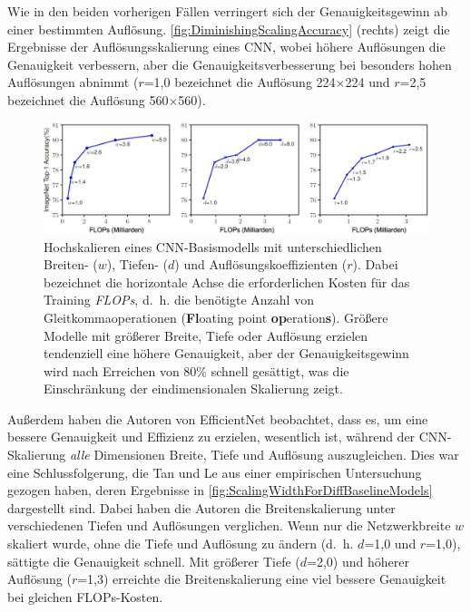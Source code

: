 \begin{description}
	Wie in den beiden vorherigen Fällen verringert sich der Genauigkeitsgewinn ab einer bestimmten Auflösung. \autoref{fig:DiminishingScalingAccuracy} (rechts) zeigt die Ergebnisse der Auflösungsskalierung eines CNN, wobei höhere Auflösungen die Genauigkeit verbessern, aber die Genauigkeitsverbesserung bei besonders hohen Auflösungen abnimmt ($r$=1,0 bezeichnet die Auflösung 224$\times$224 und $r$=2,5 bezeichnet die Auflösung 560$\times$560).
\end{description}

\begin{figure}[!h]
	\centering
	\includegraphics[width=\linewidth]{images/DiminishingScalingAccuracy}
	\caption{Hochskalieren eines CNN-Basismodells mit unterschiedlichen Breiten- ($w$), Tiefen- ($d$) und Auflösungskoeffizienten ($r$). Dabei bezeichnet die horizontale Achse die erforderlichen Kosten für das Training \emph{FLOPs}, d.~h. die benötigte Anzahl von Gleitkommaoperationen (\textbf{Fl}oating point \textbf{op}eration\textbf{s}). Größere Modelle mit größerer Breite, Tiefe oder Auflösung erzielen tendenziell eine höhere Genauigkeit, aber der Genauigkeitsgewinn wird nach Erreichen von 80\% schnell gesättigt, was die Einschränkung der eindimensionalen Skalierung zeigt. \protect\cite{tan2020efficientnet}}
	\label{fig:DiminishingScalingAccuracy}
\end{figure}

Außerdem haben die Autoren von EfficientNet beobachtet, dass es, um eine bessere Genauigkeit und Effizienz zu erzielen, wesentlich ist, während der CNN-Skalierung \textit{alle} Dimensionen Breite, Tiefe und Auflösung auszugleichen. Dies war eine Schlussfolgerung, die Tan und Le aus einer empirischen Untersuchung gezogen haben, deren Ergebnisse in \autoref{fig:ScalingWidthForDiffBaselineModels} dargestellt sind. Dabei haben die Autoren die Breitenskalierung unter verschiedenen Tiefen und Auflösungen verglichen. Wenn nur die Netzwerkbreite $w$ skaliert wurde, ohne die Tiefe und Auflösung zu ändern (d.~h. $d$=1,0 und $r$=1,0), sättigte die Genauigkeit schnell. Mit größerer Tiefe ($d$=2,0) und höherer Auflösung ($r$=1,3) erreichte die Breitenskalierung eine viel bessere Genauigkeit bei gleichen FLOPs-Kosten.

